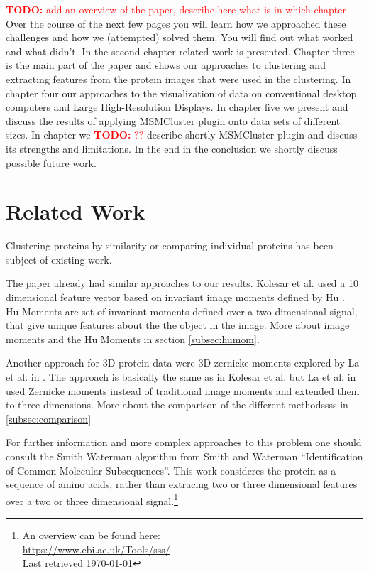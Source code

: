\documentclass[journal]{vgtc}       %
\newcommand{\todo}[1]{\textcolor{red}{\textbf{TODO:} #1}}
\begin{document}
\todo{add an overview of the paper, describe here what is in which chapter} Over the course of the next few pages you will learn how we approached these challenges and how we (attempted) solved them. You will find out what  worked and what didn't. In the second chapter related work is presented. Chapter three is the main part of the paper and shows our approaches to clustering and extracting features from the protein images that were used in the clustering. In chapter four our approaches to the visualization of data on conventional desktop computers and Large High-Resolution Displays. In chapter five we present and discuss the results of applying MSMCluster plugin onto data sets of different sizes. In chapter we \todo{??} describe shortly MSMCluster plugin and discuss its strengths and limitations. In the end in the conclusion we shortly discuss possible future work.


\section{Related Work}\label{sec:relatedWork}

Clustering proteins by similarity or comparing individual proteins has been subject of existing work.

The paper \cite{kolesar} already had similar approaches to our results. Kolesar et al. used a 10 dimensional feature vector based on invariant image moments defined by Hu \cite{humoments}. Hu-Moments are set of invariant moments defined over a two dimensional signal, that give unique features about the the object in the image. More about image moments and the Hu Moments in section \ref{subsec:humom}.


Another approach for 3D protein data were 3D zernicke moments explored by La et al. in \cite{3dsurfer}. The approach is basically the same as in Kolesar et al. but La et al.  in \cite{3dsurfer} used Zernicke moments instead of traditional image moments and extended them to three dimensions. More about the comparison of the different methodssss in \ref{subsec:comparison}

For further information and more complex approaches to this problem one should consult the Smith Waterman algorithm from Smith and Waterman ``Identification of Common Molecular Subsequences''\cite{smithwater}. This work consideres the protein as a sequence of amino acids, rather than extracing two or three dimensional features over a two or three dimensional signal.\footnote{An overview can be found here: \\ \url{https://www.ebi.ac.uk/Tools/sss/}\\ Last retrieved \today}
\end{document}
